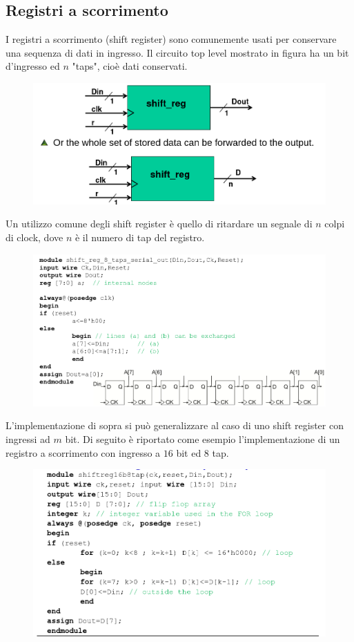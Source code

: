 \documentclass{book}
\begin{document}
            \subsection{Registri a scorrimento}
            I registri a scorrimento (shift register) sono comunemente usati per conservare una sequenza di 
            dati in ingresso. Il circuito top level mostrato in figura ha un bit d'ingresso ed
            $n$ "taps", cioè dati conservati.
            \begin{figure}[h!]
                \center 
                \includegraphics[width=0.75\linewidth]{img/chapt11img12.png}
            \end{figure}
            Un utilizzo comune degli shift register è quello di ritardare un segnale di $n$ colpi di clock,
            dove $n$ è il numero di tap del registro.
            \begin{figure}[h!]
                \center 
                \includegraphics[width=0.75\linewidth]{img/chapt11img13.png}
            \end{figure}
            \newpage
            L'implementazione di sopra si può generalizzare al caso di uno shift register con
            ingressi ad $m$ bit. Di seguito è riportato come esempio l'implementazione di un registro
            a scorrimento con ingresso a $16$ bit ed $8$ tap.
            \begin{figure}[h!]
                \center
                \includegraphics[width=0.75\linewidth]{img/chapt11img14.png}
            \end{figure}
\end{document}
